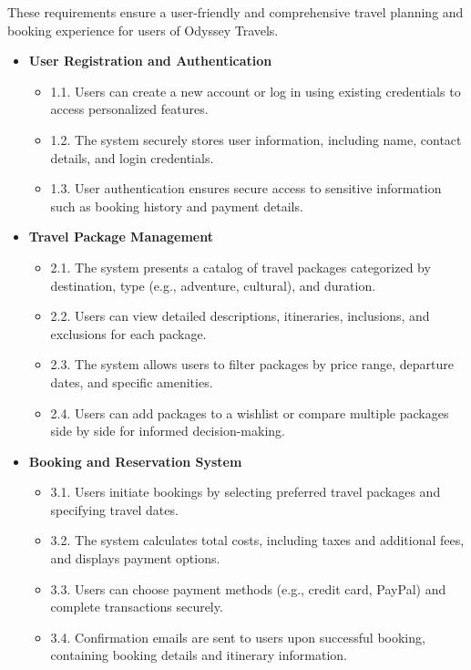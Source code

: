 \documentclass{scrreprt}
\begin{document}
These requirements ensure a user-friendly and comprehensive travel planning and booking experience for users of Odyssey Travels.

\begin{itemize}
    \item \textbf{User Registration and Authentication}
    \begin{itemize}
        \item 1.1. Users can create a new account or log in using existing credentials to access personalized features.
        \item 1.2. The system securely stores user information, including name, contact details, and login credentials.
        \item 1.3. User authentication ensures secure access to sensitive information such as booking history and payment details.
    \end{itemize}
    
    \item \textbf{Travel Package Management}
    \begin{itemize}
        \item 2.1. The system presents a catalog of travel packages categorized by destination, type (e.g., adventure, cultural), and duration.
        \item 2.2. Users can view detailed descriptions, itineraries, inclusions, and exclusions for each package.
        \item 2.3. The system allows users to filter packages by price range, departure dates, and specific amenities.
        \item 2.4. Users can add packages to a wishlist or compare multiple packages side by side for informed decision-making.
    \end{itemize}
    
    \item \textbf{Booking and Reservation System}
    \begin{itemize}
        \item 3.1. Users initiate bookings by selecting preferred travel packages and specifying travel dates.
        \item 3.2. The system calculates total costs, including taxes and additional fees, and displays payment options.
        \item 3.3. Users can choose payment methods (e.g., credit card, PayPal) and complete transactions securely.
        \item 3.4. Confirmation emails are sent to users upon successful booking, containing booking details and itinerary information.
    \end{itemize}
    

\end{itemize}
\end{document}
